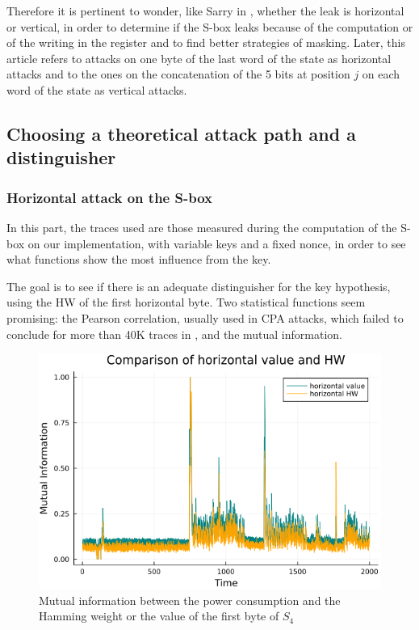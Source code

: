\documentclass[11pt,technote]{IEEEtran}
\begin{document}
		Therefore it is pertinent to wonder, like Sarry in \cite{these}, whether the leak is horizontal or vertical, in order to determine if the S-box leaks because of the computation or of the writing in the register and to find better strategies of masking. Later, this article refers to attacks on one byte of the last word of the state as horizontal attacks and to the ones on the concatenation of the 5 bits at position $j$ on each word of the state as vertical attacks.
		
		\subsection{Choosing a theoretical attack path and a distinguisher} \label{choice}
		\subsubsection{Horizontal attack on the S-box}
		In this part, the traces used are those measured during the computation of the S-box on our implementation, with variable keys and a fixed nonce, in order to see what functions show the most influence from the key.
		
		The goal is to see if there is an adequate distinguisher for the key hypothesis, using the HW of the first horizontal byte. Two statistical functions seem promising: the Pearson correlation, usually used in CPA attacks, which failed to conclude for more than 40K traces in \cite{dl_cpa}, and the mutual information.
		
		\begin{figure}[h]
		\centering
		\includegraphics[scale=0.4]{img_files/horizontal_one_byte}
		\caption{Mutual information between the power consumption and the Hamming weight or the value of the first byte of $S_4$}
		\label{hHW&val}
		\end{figure}
		
\end{document}
